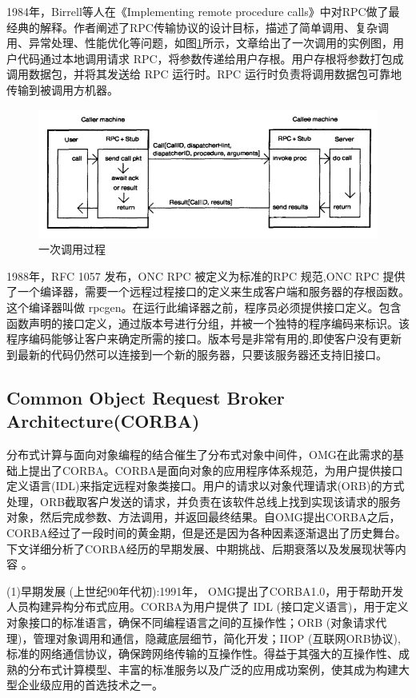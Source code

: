 \documentclass[a4paper,twoside]{scrbook}
\begin{document}
\begin{CJK}{UTF8}{gbsn}
1984年，Birrell\cite{birrell1984implementing}等人在《Implementing remote procedure calls》中对RPC做了最经典的解释。作者阐述了RPC传输协议的设计目标，描述了简单调用、复杂调用、异常处理、性能优化等问题，如图\ref{fig:A simple call}所示，文章给出了一次调用的实例图，用户代码通过本地调用请求 RPC，将参数传递给用户存根。用户存根将参数打包成调用数据包，并将其发送给 RPC 运行时。RPC 运行时负责将调用数据包可靠地传输到被调用方机器。
\begin{figure}[!htbp]
\centering
\includegraphics[width=1\textwidth]{Figures/A simple call.png}
\caption{一次调用过程} 
\label{fig:A simple call}
\end{figure}
1988年，RFC 1057 发布，ONC RPC 被定义为标准的RPC 规范,ONC RPC 提供了一个编译器，需要一个远程过程接口的定义来生成客户端和服务器的存根函数。这个编译器叫做 rpcgen。在运行此编译器之前，程序员必须提供接口定义。包含函数声明的接口定义，通过版本号进行分组，并被一个独特的程序编码来标识。该程序编码能够让客户来确定所需的接口。版本号是非常有用的,即使客户没有更新到最新的代码仍然可以连接到一个新的服务器，只要该服务器还支持旧接口。
\subsection{Common Object Request Broker Architecture(CORBA)}
分布式计算与面向对象编程的结合催生了分布式对象中间件，OMG在此需求的基础上提出了CORBA。CORBA是面向对象的应用程序体系规范，为用户提供接口定义语言(IDL)来指定远程对象类接口。用户的请求以对象代理请求(ORB)的方式处理，ORB截取客户发送的请求，并负责在该软件总线上找到实现该请求的服务对象，然后完成参数、方法调用，并返回最终结果。自OMG提出CORBA之后，CORBA经过了一段时间的黄金期，但是还是因为各种因素逐渐退出了历史舞台。下文详细分析了CORBA经历的早期发展、中期挑战、后期衰落以及发展现状等内容\cite{siegel1998omg} \cite{henning2006rise}。

(1)早期发展 (上世纪90年代初):1991年， OMG提出了CORBA1.0，用于帮助开发人员构建异构分布式应用。CORBA为用户提供了 IDL (接口定义语言)，用于定义对象接口的标准语言，确保不同编程语言之间的互操作性；ORB (对象请求代理)，管理对象调用和通信，隐藏底层细节，简化开发；IIOP (互联网ORB协议),标准的网络通信协议，确保跨网络传输的互操作性。得益于其强大的互操作性、成熟的分布式计算模型、丰富的标准服务以及广泛的应用成功案例，使其成为构建大型企业级应用的首选技术之一。


\end{CJK}
\end{document}
